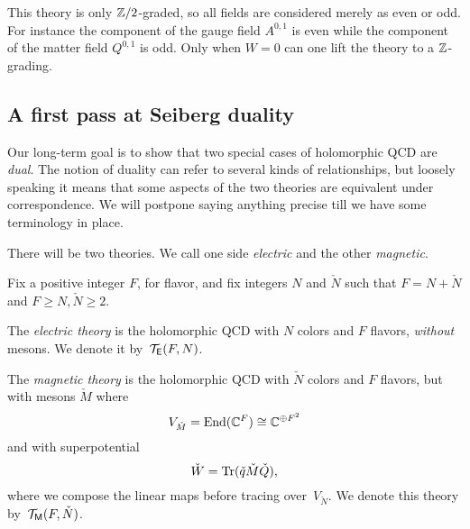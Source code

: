 \documentclass[11pt]{amsart}
\def\SU{{\rm SU}}
\begin{document}
\begin{rmk}
This theory is only $\mathbb Z/2$-graded, so all fields are considered merely as even or odd.
For instance the component of the gauge field $A^{0,1}$ is even while the component of the matter field $Q^{0,1}$ is odd. 
Only when $W = 0$ can one lift the theory to a $\mathbb Z$-grading.
\end{rmk}

\subsection{A first pass at Seiberg duality}

Our long-term goal is to show that two special cases of holomorphic QCD are {\em dual}.
The notion of duality can refer to several kinds of relationships,
but loosely speaking it means that some aspects of the two theories are equivalent under correspondence.
We will postpone saying anything precise till we have some terminology in place.


There will be two theories. 
We call one side {\em electric} and the other {\em magnetic}.

\begin{dfn}
Fix a positive integer $F$, for flavor, and fix integers $N$ and $\check{N}$ such that $F = N + \check{N}$ and $F \geq N, \check{N} \geq 2$.

The {\em electric theory} is the holomorphic QCD with $N$ colors and $F$ flavors, {\em without} mesons.
We denote it by~$\mathcal T_{\mathsf E}(F, N)$.

The {\em magnetic theory} is the holomorphic QCD with $\check{N}$ colors and $F$ flavors, but with mesons $\check{M}$ where $$V_{\check{M}} = {\rm End}(\mathbb C^F) \cong \mathbb C^{\oplus F^2}$$ and with superpotential $$\check{W} =  {\rm Tr}(\check{q} \check{M}  \check{Q}),$$
where we compose the linear maps before tracing over~$V_{\check{N}}$.
We denote this theory by~$\mathcal T_{{\sf M}}(F, \check{N})$.
\end{dfn}
\end{document}
